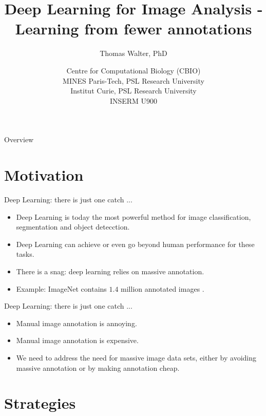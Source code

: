 \documentclass[xcolor=pdftex,dvipsnames,table]{beamer}
\title{Deep Learning for Image Analysis - \\
	   Learning from fewer annotations}
\author{Thomas Walter, PhD}
\date{Centre for Computational Biology (CBIO) \\
	  MINES Paris-Tech, PSL Research University \\
	  Institut Curie, PSL Research University \\
	  INSERM U900}
\begin{document}
\begin{frame}
\titlepage
\end{frame}

\begin{frame}{Overview}
\tableofcontents
\end{frame}

\section{Motivation}

\begin{frame}{Deep Learning: there is just one catch ... }
\begin{itemize}
	\item Deep Learning is today the most powerful method for image classification, segmentation and object detecction. 
   \item Deep Learning can achieve or even go beyond human performance for these tasks. 
   \item There is a snag: deep learning relies on massive annotation.
   \item Example: ImageNet contains $1.4$ million annotated images \cite{ImageNet:2015}. 
\end{itemize}
\end{frame}

\begin{frame}{Deep Learning: there is just one catch ... }
\begin{itemize}
\item Manual image annotation is annoying.
\item Manual image annotation is expensive.
\item We need to address the need for massive image data sets, either by avoiding massive annotation or by making annotation cheap.
\end{itemize}
\end{frame}

\section{Strategies}
\end{document}
